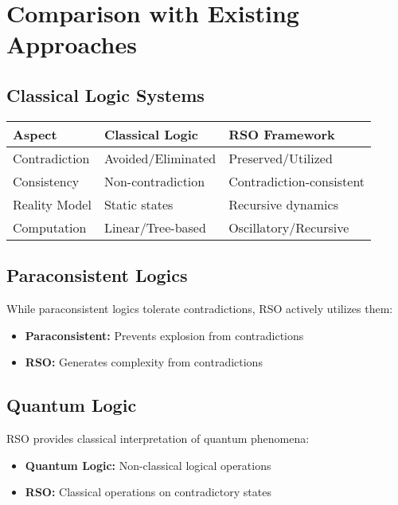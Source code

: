 \documentclass[11pt,a4paper]{article}
\begin{document}
\section{Comparison with Existing Approaches}

\subsection{Classical Logic Systems}

\begin{center}
\begin{tabular}{p{}p{}p{}}
\toprule
\textbf{Aspect} & \textbf{Classical Logic} & \textbf{RSO Framework} \\
\midrule
Contradiction & Avoided/Eliminated & Preserved/Utilized \\
Consistency & Non-contradiction & Contradiction-consistent \\
Reality Model & Static states & Recursive dynamics \\
Computation & Linear/Tree-based & Oscillatory/Recursive \\
\bottomrule
\end{tabular}
\end{center}

\subsection{Paraconsistent Logics}

While paraconsistent logics tolerate contradictions, RSO actively utilizes them:

\begin{itemize}
    \item \textbf{Paraconsistent:} Prevents explosion from contradictions
    \item \textbf{RSO:} Generates complexity from contradictions
\end{itemize}

\subsection{Quantum Logic}

RSO provides classical interpretation of quantum phenomena:

\begin{itemize}
    \item \textbf{Quantum Logic:} Non-classical logical operations
    \item \textbf{RSO:} Classical operations on contradictory states
\end{itemize}
\end{document}
